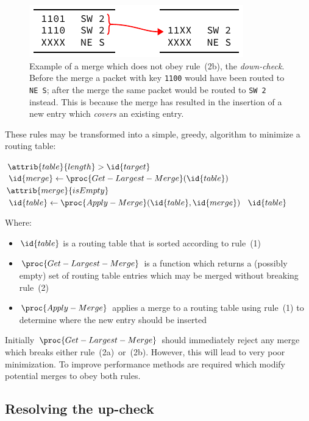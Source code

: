 \documentclass[conference]{IEEEtran}
\newcommand{\mytt}[1]{\texttt{\footnotesize#1}}
\begin{document}
  \begin{figure}
    \centering
    \includegraphics{figures/rule2b_example}
    \caption{
      Example of a merge which does not obey rule~(2b), the \textit{down-check}.
      Before the merge a packet with key \mytt{1100} would have been routed to \mytt{NE~S}; after the merge the same packet would be routed to \mytt{SW 2} instead.
      This is because the merge has resulted in the insertion of a new entry which \textit{covers} an existing entry.
    }
    \label{fig:algorithm/rule2b_example}
  \end{figure}

  These rules may be transformed into a simple, greedy, algorithm to minimize a routing table:

  \begin{codebox}
    \li \While $\attrib{table}{length} >  \id{target}$
    \li \Do $\id{merge} \gets \proc{Get-Largest-Merge}(\id{table})$
    \li     \If $\attrib{merge}{isEmpty}$
    \li     \Then {} \End
    \li     $\id{table} \gets \proc{Apply-Merge}(\id{table}, \id{merge})$
        \End
    \li \Return $\id{table}$
  \end{codebox}

  \noindent Where:
  \begin{itemize}
    \item $\id{table}$ is a routing table that is sorted according to rule~(1)
    \item $\proc{Get-Largest-Merge}$ is a function which returns a (possibly empty) set of routing table entries which may be merged without breaking rule~(2)
    \item $\proc{Apply-Merge}$ applies a merge to a routing table using rule~(1) to determine where the new entry should be inserted
  \end{itemize}

  Initially $\proc{Get-Largest-Merge}$ should immediately reject any merge which breaks either rule~(2a)~or~(2b).
  However, this will lead to very poor minimization.
  To improve performance methods are required which modify potential merges to obey both rules.

  \subsection{Resolving the up-check}
\end{document}
